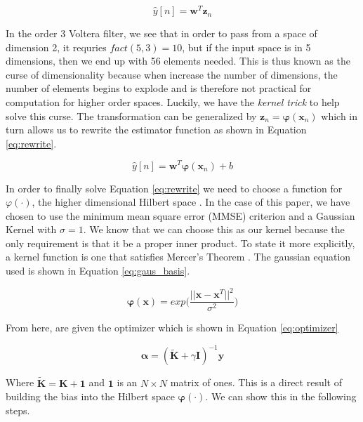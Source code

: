 \documentclass[11pt, twoside]{article}   	%
\begin{document}
\begin{equation}
\hat{y}[n] = \mathbf{w}^T\mathbf{z}_n
\label{eq:reform}
\end{equation}

 In the order 3 Voltera filter, we see that in order to pass from a space of dimension 2, it requries $fact(5, 3) = 10$, but if the input space is in 5 dimensions, then we end up with 56 elements needed.
 This is thus known as the curse of dimensionality because when increase the number of dimensions, the number of elements begins to explode and is therefore not practical for computation
 for higher order spaces. Luckily, we have the \textit{kernel trick} to help solve this curse. The transformation can be generalized by $\mathbf{z}_n = \mathbf{\varphi}(\mathbf{x}_n)$ 
 which in turn allows us to rewrite the estimator function as shown in Equation \ref{eq:rewrite}. 
 
 \begin{equation}
\hat{y}[n] = \mathbf{w}^T\mathbf{\varphi}(\mathbf{x}_n) + b
\label{eq:rewrite}
\end{equation}

In order to finally solve Equation \ref{eq:rewrite} we need to choose a function for $\varphi(\cdot)$, the higher dimensional Hilbert space \cite{kernelmethods}. In 
the case of this paper, we have chosen to use the minimum mean square error (MMSE) criterion and a Gaussian Kernel with $\sigma = 1$. We know that we can choose this
as our kernel because the only requirement is that it be a proper inner product. To state it more explicitly, a kernel function is one that satisfies Mercer's Theorem \cite{kernelmethods}. The gaussian equation 
used is shown in Equation \ref{eq:gaus_basis}.

\begin{equation}
\mathbf{\varphi(x)} = exp\bigg(\frac{||\mathbf{x} - \mathbf{x}^T||^2}{\sigma^2}\bigg)
\label{eq:gaus_basis}
\end{equation}

From here, are given the optimizer which is shown in Equation \ref{eq:optimizer} 

\begin{equation}
\mathbf{\alpha} = (\mathbf{\widetilde{K}} + \gamma \mathbf{I})^{-1}\mathbf{y}
\label{eq:optimizer}
\end{equation}

Where $\mathbf{\widetilde{K}} = \mathbf{K} + \mathbf{1}$ and $\mathbf{1}$ is an $N \times N$ matrix of ones. This is a direct result
of building the bias into the Hilbert space $\mathbf{\varphi(\cdot)}$. We can show this in the following steps. 
\end{document}
